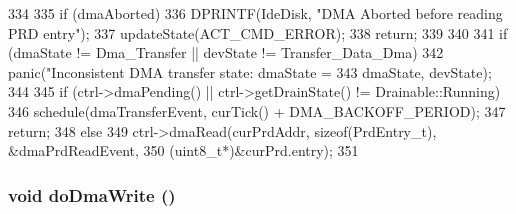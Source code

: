 \begin{DoxyCode}
334 {
335     if (dmaAborted) {
336         DPRINTF(IdeDisk, "DMA Aborted before reading PRD entry\n");
337         updateState(ACT_CMD_ERROR);
338         return;
339     }
340 
341     if (dmaState != Dma_Transfer || devState != Transfer_Data_Dma)
342         panic("Inconsistent DMA transfer state: dmaState = %
343               dmaState, devState);
344 
345     if (ctrl->dmaPending() || ctrl->getDrainState() != Drainable::Running) {
346         schedule(dmaTransferEvent, curTick() + DMA_BACKOFF_PERIOD);
347         return;
348     } else
349         ctrl->dmaRead(curPrdAddr, sizeof(PrdEntry_t), &dmaPrdReadEvent,
350                 (uint8_t*)&curPrd.entry);
351 }
\end{DoxyCode}
\hypertarget{classIdeDisk_ae547bc5391513f6cea7d857dc015f5da}{
\subsubsection[{doDmaWrite}]{\setlength{\rightskip}{0pt plus 5cm}void doDmaWrite ()}}
\label{classIdeDisk_ae547bc5391513f6cea7d857dc015f5da}



